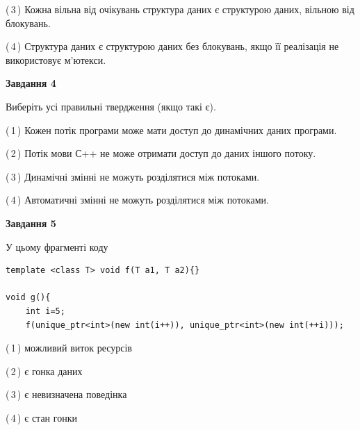 \documentclass[12pt, ukrainian]{article}
\begin{document}
\begin {large}
{(\,3\,) Кожна вільна від очікувань структура даних є структурою даних, вільною від блокувань.%

(\,4\,) Структура даних є структурою даних без блокувань, якщо її реалізація не використовує м’ютекси.%



\begin{center}
\textbf{Завдання 4}
\end{center}
Виберіть усі правильні твердження (якщо такі є).\par
\vspace{2mm}

(\,1\,) Кожен потік програми може мати доступ до динамічних даних програми.%

(\,2\,) Потік мови С++ не може отримати доступ до даних іншого потоку.%

(\,3\,) Динамічні змінні не можуть розділятися між потоками.%

(\,4\,) Автоматичні змінні не можуть розділятися між потоками.%



\begin{center}
\textbf{Завдання 5}
\end{center}
У цьому фрагменті коду
\begin{verbatim}
template <class T> void f(T a1, T a2){}

void g(){
    int i=5;
    f(unique_ptr<int>(new int(i++)), unique_ptr<int>(new int(++i)));
\end{verbatim}

(\,1\,) можливий виток ресурсів%

(\,2\,) є гонка даних%

(\,3\,) є невизначена поведінка%

(\,4\,) є стан гонки%


}
\end {large}
\end{document}
